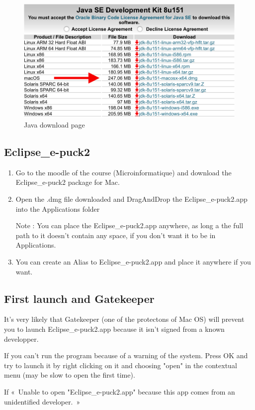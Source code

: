 \documentclass[a4paper]{article}
\begin{document}
\begin{figure}[!h]
\centering
\includegraphics[width=0.7\columnwidth]{fig/Java_mac}
\caption{Java download page}
\label{fig:Java_mac}
\end{figure}

\subsection{Eclipse\_e-puck2}

\begin{enumerate}
\item Go to the moodle of the course (Microinformatique) and download the Eclipse\_e-puck2 package for Mac.
\item Open the .dmg file downloaded and DragAndDrop the Eclipse\_e-puck2.app into the Applications folder

Note : You can place the Eclipse\_e-puck2.app anywhere, as long a the full path to it doesn't contain any space, if you don't want it to be in Applications.
\item You can create an Alias to Eclipse\_e-puck2.app and place it anywhere if you want.
\end{enumerate}

\subsection{First launch and Gatekeeper}

It's very likely that Gatekeeper (one of the protectons of Mac OS) will prevent you to launch Eclipse\_e-puck2.app because it isn't signed from a known developper. 

If you can't run the program because of a warning of the system. Press OK and try to launch it by right clicking on it and choosing "open" in the contextual menu (may be slow to open the first time).

If « Unable to open "Eclipse\_e-puck2.app" because this app comes from an unidentified developer. »  
\end{document}
